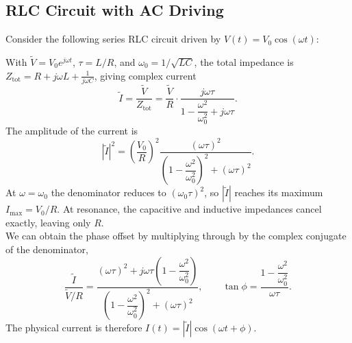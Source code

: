 \documentclass{article}
\begin{document}
\subsection{RLC Circuit with AC Driving}
Consider the following series RLC circuit driven by $V(t) = V_0\cos(\omega t)$:
\begin{center}
\end{center}
With $\tilde{V} = V_0 e^{j\omega t}$, $\tau = L/R$, and $\omega_0 = 1/\sqrt{LC}$, the total impedance is $Z_{\text{tot}} = R + j\omega L + \frac{1}{j\omega C}$, giving complex current
\[\tilde{I} = \frac{\tilde{V}}{Z_{\text{tot}}} = \frac{\tilde{V}}{R}\cdot\frac{j\omega\tau}{1 - \dfrac{\omega^2}{\omega_0^2} + j\omega\tau}.\]
The amplitude of the current is
\[|\tilde{I}|^2 = \left(\frac{V_0}{R}\right)^2 \frac{(\omega\tau)^2}{\left(1 - \dfrac{\omega^2}{\omega_0^2}\right)^2 + (\omega\tau)^2}.\]
At $\omega = \omega_0$ the denominator reduces to $(\omega_0\tau)^2$, so $|\tilde{I}|$ reaches its maximum $I_{\max} = V_0/R$. At resonance, the capacitive and inductive impedances cancel exactly, leaving only $R$.\\
We can obtain the phase offset by multiplying through by the complex conjugate of the denominator,
\[\frac{\tilde{I}}{\tilde{V}/R} = \frac{(\omega\tau)^2 + j\omega\tau\!\left(1 - \dfrac{\omega^2}{\omega_0^2}\right)}{\left(1 - \dfrac{\omega^2}{\omega_0^2}\right)^2 + (\omega\tau)^2}, \qquad \tan\phi = \frac{1 - \dfrac{\omega^2}{\omega_0^2}}{\omega\tau}.\]
The physical current is therefore $I(t) = |\tilde{I}|\cos(\omega t + \phi)$.

\end{document}
